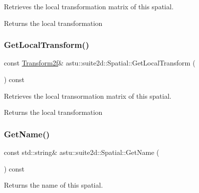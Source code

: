 Retrieves the local transformation matrix of this spatial.

\begin{DoxyReturn}{Returns}
the local transformation 
\end{DoxyReturn}
\mbox{\label{classastu_1_1suite2d_1_1Spatial_a9865215a9b5ed5ebe76fa04ec01220c7}} 
\subsubsection{\texorpdfstring{Get\+Local\+Transform()}{GetLocalTransform()}\hspace{0.1cm}{\footnotesize\ttfamily [2/2]}}
{\footnotesize\ttfamily const \hyperlink{group__math__group_gac67b5e9d27308a01ea8190ecb15e08fa}{Transform2f}\& astu\+::suite2d\+::\+Spatial\+::\+Get\+Local\+Transform (\begin{DoxyParamCaption}{ }\end{DoxyParamCaption}) const\hspace{0.3cm}{\ttfamily [inline]}}

Retrieves the local transormation matrix of this spatial.

\begin{DoxyReturn}{Returns}
the local transformation 
\end{DoxyReturn}
\mbox{\label{classastu_1_1suite2d_1_1Spatial_a53456f456c3cccccd5d96be74f751622}} 
\subsubsection{\texorpdfstring{Get\+Name()}{GetName()}}
{\footnotesize\ttfamily const std\+::string\& astu\+::suite2d\+::\+Spatial\+::\+Get\+Name (\begin{DoxyParamCaption}{ }\end{DoxyParamCaption}) const\hspace{0.3cm}{\ttfamily [inline]}}

Returns the name of this spatial.

